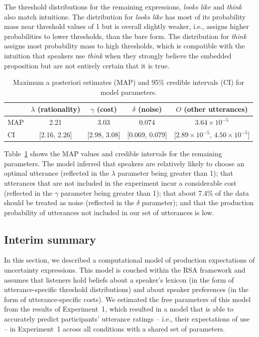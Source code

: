 \documentclass[man, floatsintext]{apa6}
\newcommand{\tableref}[1]{Table~\ref{#1}}
\begin{document}
The threshold distributions for the remaining expressions, \textit{looks like} and \textit{think} also match intuitions. The distribution for 
\textit{looks like} has most of its probability mass near threshold values of 1 but is overall slightly weaker, i.e., assigns higher probabilities to lower thresholds,
than the bare form. The distribution for \textit{think} assigns most probability mass to high thresholds, which is compatible with the intuition
that speakers use \textit{think} when they strongly believe the embedded proposition but are not entirely certain that it is true.
 
 
 \begin{table}[ht!]
\center
\begin{tabular}{l | c | c | c | c }
     & $\lambda$ (rationality) & $\gamma$ (cost) & $\delta$ (noise) & $O$ (other utterances) \\
      \midrule
      MAP & 2.21 & 3.03 & 0.074 & $3.64 \times 10^{-5}$ \\
      CI & [2.16, 2.26] & [2.98, 3.08] &  [0.069, 0.079] &[$2.89 \times 10^{-5}$, $4.50  \times 10^{-5}$] \\
      
         \end{tabular}
\caption{Maximum a posteriori estimates (MAP) and 95\% credible intervals (CI) for model parameters. \label{tbl:model-params}}
\end{table}

  \tableref{tbl:model-params} shows the MAP values and credible intervals for the remaining parameters. The model inferred that speakers
  are relatively likely to choose an optimal utterance (reflected in the $\lambda$ parameter being
  greater than 1); that utterances that are not included in the experiment incur a considerable cost  (reflected in the $\gamma$ parameter being greater than 1); that about 7.4\%
  of the data should be treated as noise (reflected in the $\delta$ parameter); and that the production probability of utterances not included in our set of utterances is low. 

 
 \subsection{Interim summary}
 
 In this section, we described a computational model of production expectations of uncertainty expressions. This model
 is couched within the RSA framework and assumes that listeners hold beliefs about a speaker's lexicon (in the form
 of utterance-specific threshold distributions) and about speaker preferences (in the form of utterance-specific costs). We estimated 
 the free parameters of this model from the results of Experiment~1, which resulted in a model that is able to accurately predict
 participants' utterance ratings -- i.e., their expectations of use --  in Experiment~1 across all conditions with a shared set of parameters.
 
\end{document}
